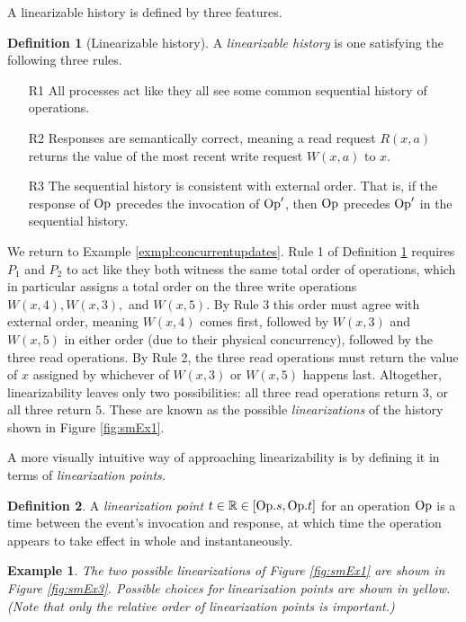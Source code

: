 \documentclass[]             %
{NASA}                       %
\newtheorem{example}{Example}
\theoremstyle{definition}
\newtheorem{definition}{Definition}[section]
\providecommand{\tightlist}{%
  \setlength{\itemsep}{0pt}\setlength{\parskip}{0pt}}
\begin{document}
A linearizable history is defined by three features.
\begin{definition}[Linearizable history]
  \label{def:linearizable}
  A \emph{linearizable history} is one satisfying the following three rules.
\begin{enumerate}
  \tightlist
\item[R1] All processes act like they all see some common sequential
  history of operations.
\item[R2] Responses are semantically correct, meaning a read request
  \(R(x, a)\) returns the value of the most recent write request
  \(W(x, a)\) to \(x\).
\item[R3] The sequential history is consistent with external
  order. That is, if the response of $\mathrm{Op}$ precedes the invocation of
  $\mathrm{Op}'$, then $\mathrm{Op}$ precedes $\mathrm{Op}'$ in the sequential history.
\end{enumerate}
\end{definition}

We return to Example \ref{exmpl:concurrentupdates}. Rule 1 of
Definition \ref{def:linearizable} requires $P_1$ and $P_2$ to act like
they both witness the same total order of operations, which in
particular assigns a total order on the three write operations
$W(x,4), W(x,3),$ and $W(x,5)$. By Rule 3 this order must agree with
external order, meaning $W(x,4)$ comes first, followed by $W(x,3)$ and
$W(x,5)$ in either order (due to their physical concurrency), followed
by the three read operations. By Rule 2, the three read operations
must return the value of $x$ assigned by whichever of $W(x,3)$ or
$W(x,5)$ happens last. Altogether, linearizability leaves only two
possibilities: all three read operations return $3$, or all three
return $5$. These are known as the possible \emph{linearizations} of
the history shown in Figure \ref{fig:smEx1}.

A more visually intuitive way of approaching linearizability is by
defining it in terms of \emph{linearization points.}

\begin{definition}
  A \emph{linearization point} $t \in \mathbb{R} \in [\mathrm{Op}.s, \mathrm{Op}.t]$
  for an operation $\mathrm{Op}$ is a time between the event's invocation and
  response, at which time the operation appears to take effect in
  whole and instantaneously.
\end{definition}

\begin{example}
  \label{exmpl:linearizations}
  The two possible linearizations of Figure \ref{fig:smEx1} are shown
  in Figure \ref{fig:smEx3}. Possible choices for linearization points
  are shown in yellow. (Note that only the relative order of
  linearization points is important.)
\end{example}
\end{document}
